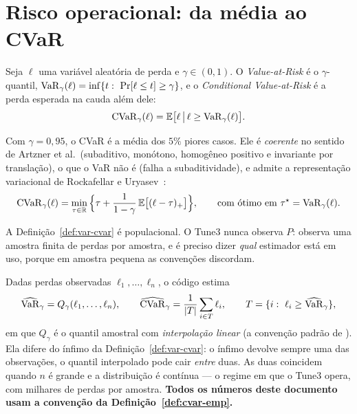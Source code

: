 \section{Risco operacional: da média ao CVaR}\label{sec:risco}

\begin{definicao}\label{def:var-cvar}
Seja $\ell$ uma variável aleatória de perda e $\gamma\in(0,1)$. O \emph{Value-at-Risk} é o $\gamma$-quantil,
$\operatorname{VaR}_\gamma(\ell)=\inf\{t:\ \Pr[\ell\le t]\ge\gamma\}$, e o \emph{Conditional Value-at-Risk} é a perda esperada na cauda além dele:
\[
\operatorname{CVaR}_\gamma(\ell)=\mathbb{E}\big[\ell \,\big|\, \ell\ge\operatorname{VaR}_\gamma(\ell)\big].
\]
\end{definicao}

Com $\gamma=0{,}95$, o CVaR é a média dos $5\%$ piores casos. Ele é \emph{coerente} no sentido de Artzner et al.\ (subaditivo, monótono, homogêneo positivo e invariante por translação), o que o VaR não é (falha a subaditividade), e admite a representação variacional de Rockafellar e Uryasev~\cite{rockafellar2000}:
\begin{equation}\label{eq:ru}
\operatorname{CVaR}_\gamma(\ell)=\min_{\tau\in\mathbb{R}}\Big\{\tau+\frac{1}{1-\gamma}\,\mathbb{E}\big[(\ell-\tau)_+\big]\Big\},
\qquad \text{com ótimo em } \tau^\star=\operatorname{VaR}_\gamma(\ell).
\end{equation}

A Definição~\ref{def:var-cvar} é populacional. O Tune3 nunca observa $P$: observa uma amostra finita de perdas por amostra, e é preciso dizer \emph{qual} estimador está em uso, porque em amostra pequena as convenções discordam.

\begin{definicao}\label{def:cvar-emp}
Dadas perdas observadas $\ell_1,\dots,\ell_n$, o código estima
\[
\widehat{\operatorname{VaR}}_\gamma=Q_\gamma(\ell_1,\dots,\ell_n),
\qquad
\widehat{\operatorname{CVaR}}_\gamma=\frac{1}{|T|}\sum_{i\in T}\ell_i,
\qquad T=\{i:\ \ell_i\ge\widehat{\operatorname{VaR}}_\gamma\},
\]
em que $Q_\gamma$ é o quantil amostral com \emph{interpolação linear} (a convenção padrão de ). Ela difere do ínfimo da Definição~\ref{def:var-cvar}: o ínfimo devolve sempre uma das observações, o quantil interpolado pode cair \emph{entre} duas. As duas coincidem quando $n$ é grande e a distribuição é contínua --- o regime em que o Tune3 opera, com milhares de perdas por amostra. \textbf{Todos os números deste documento usam a convenção da Definição~\ref{def:cvar-emp}.}
\end{definicao}

